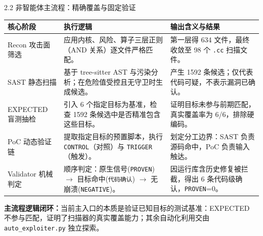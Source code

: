 \documentclass[11pt,aspectratio=169]{beamer}
\newcommand{\hlb}[1]{\textcolor{accentblue}{\textbf{#1}}}
\begin{document}
\begin{frame}{2.2 \quad 非智能体主流程：精确覆盖与固定验证}
  \scriptsize %
  \renewcommand{\arraystretch}{1.25} %

   \vspace{0.35cm}
  \hspace*{-0.3cm}\begin{tabular}{p{2.5cm}p{5.1cm}p{6.0cm}}
    \toprule
    \textbf{核心阶段} & \textbf{执行逻辑} & \textbf{输出含义与结果} \\
    \midrule
    Recon 攻击面筛选 & 应用内核、风险、算子三层正则（AND 关系）逐文件严格匹配。 & 第一层得 634 文件，最终收敛至 98 个 \texttt{.cc} 扫描文件。 \\
    SAST 静态扫描 & 基于 tree-sitter AST 与污染分析；在危险值受控且无守卫时生成候选。 & 产生 1592 条候选；仅代表代码可疑，不表示漏洞已确认。 \\
    EXPECTED 盲测抽检 & 引入 6 个指定目标为基准，检查 1592 条候选中是否精准包含这些目标。 & 证明目标未参与前期匹配，真实覆盖率为 6/6，排除硬编码。 \\
    PoC 动态验证链 & 提取指定目标的预置脚本，执行 \texttt{CONTROL}（对照）与 \texttt{TRIGGER}（触发）。 & 划定分工边界：SAST 负责源码命中，PoC 负责输入触达。 \\
    Validator 机械判定 & 顺序判定：原生信号(\texttt{PROVEN}) $\rightarrow$ 目标命中(\texttt{代码确认}) $\rightarrow$ 无崩溃(\texttt{NEGATIVE})。 & 因运行库含历史修复被拦截，得出 6 条代码级确认，\texttt{PROVEN}=0。 \\
    \bottomrule
  \end{tabular}

  \vspace{0.35cm}
  \begin{minipage}{\textwidth}
  \small\hlb{主流程逻辑闭环：}当前主入口的本质是验证已知目标的测试基准：EXPECTED 不参与匹配，证明了扫描器的真实覆盖能力；其余自动化利用交由 \texttt{auto\_exploiter.py} 独立探索。
  \end{minipage}
\end{frame}
\end{document}
